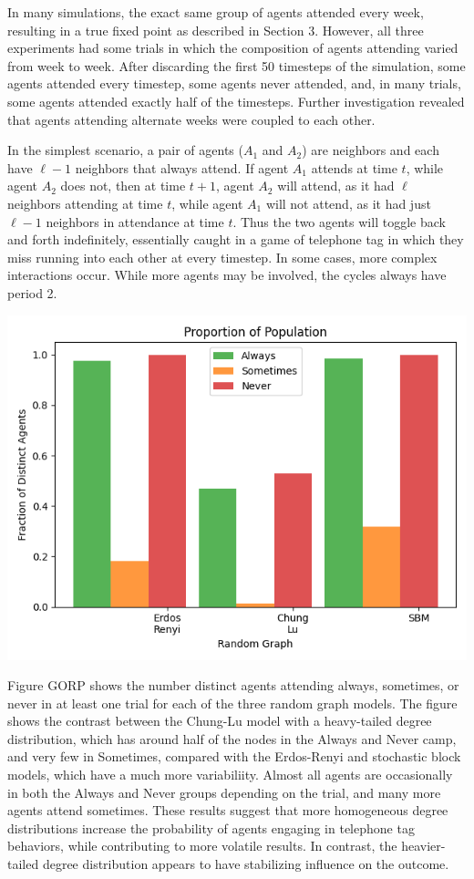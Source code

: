 \documentclass[12pt]{article}
\begin{document}
In many simulations, the exact same group of agents attended every week, resulting in a true fixed point as described in Section 3.  However, all three experiments had some trials in which the composition of agents attending varied from week to week.  After discarding the first 50 timesteps of the simulation, some agents attended every timestep, some agents never attended, and, in many trials, some agents attended exactly half of the timesteps.  Further investigation revealed that agents attending alternate weeks were coupled to each other.  

In the simplest scenario, a pair of agents ($A_1$ and $A_2$) are neighbors and each have $\ell - 1$ neighbors that always attend.  If agent $A_1$ attends at time $t$, while agent $A_2$ does not, then at time $t+1$, agent $A_2$ will attend, as it had $\ell$ neighbors attending at time $t$, while agent $A_1$ will not attend, as it had just $\ell - 1$ neighbors in attendance at time $t$.  Thus the two agents will toggle back and forth indefinitely, essentially caught in a game of telephone tag in which they miss running into each other at every timestep.  In some cases, more complex interactions occur.  While more agents may be involved, the cycles always have period 2.  

\begin{center}
\includegraphics[scale=0.7]{always_sometimes_never.png}
\end{center}

Figure GORP shows the number distinct agents attending always, sometimes, or never in at least one trial for each of the three random graph models.  The figure shows the contrast between the Chung-Lu model with a heavy-tailed degree distribution, which has around half of the nodes in the Always and Never camp, and very few in Sometimes, compared with the Erdos-Renyi and stochastic block models, which have a much more variabiliity.  Almost all agents are occasionally in both the Always and Never groups depending on the trial, and many more agents attend sometimes.  These results suggest that more homogeneous degree distributions increase the probability of agents engaging in telephone tag behaviors, while contributing to more volatile results.  In contrast, the heavier-tailed degree distribution appears to have stabilizing influence on the outcome.
\end{document}
